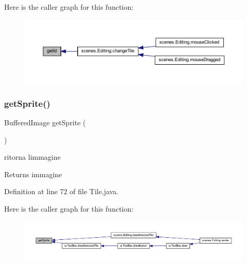 Here is the caller graph for this function\+:\nopagebreak
\begin{figure}[H]
\begin{center}
\leavevmode
\includegraphics[width=350pt]{classobjects_1_1_tile_a67283be3f45257d1e0c474c563ebb6b6_icgraph}
\end{center}
\end{figure}
\mbox{\label{classobjects_1_1_tile_ac51c0c8c26d79dc6df726b968276afb2}} 
\subsubsection{\texorpdfstring{get\+Sprite()}{getSprite()}}
{\footnotesize\ttfamily Buffered\+Image get\+Sprite (\begin{DoxyParamCaption}{ }\end{DoxyParamCaption})}



ritorna l\textquotesingle{}immagine 

\begin{DoxyReturn}{Returns}
immagine 
\end{DoxyReturn}


Definition at line 72 of file Tile.\+java.

Here is the caller graph for this function\+:\nopagebreak
\begin{figure}[H]
\begin{center}
\leavevmode
\includegraphics[width=350pt]{classobjects_1_1_tile_ac51c0c8c26d79dc6df726b968276afb2_icgraph}
\end{center}
\end{figure}
\mbox{\label{classobjects_1_1_tile_af71d2cd2060d5ecee3b0a8c387b981dd}} 
